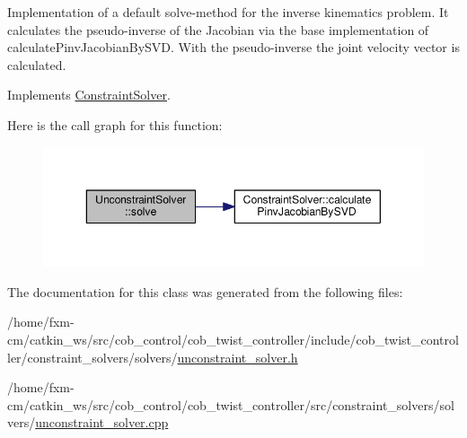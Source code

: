 Implementation of a default solve-\/method for the inverse kinematics problem. It calculates the pseudo-\/inverse of the Jacobian via the base implementation of calculate\-Pinv\-Jacobian\-By\-S\-V\-D. With the pseudo-\/inverse the joint velocity vector is calculated. 

Implements \hyperlink{classConstraintSolver_a6208240cb2dc47fdd9adfc3a069408cd}{Constraint\-Solver}.



Here is the call graph for this function\-:
\nopagebreak
\begin{figure}[H]
\begin{center}
\leavevmode
\includegraphics[width=350pt]{classUnconstraintSolver_a72e63efba891d2a55f4c95746b8d7b33_cgraph}
\end{center}
\end{figure}




The documentation for this class was generated from the following files\-:\begin{DoxyCompactItemize}
\item 
/home/fxm-\/cm/catkin\-\_\-ws/src/cob\-\_\-control/cob\-\_\-twist\-\_\-controller/include/cob\-\_\-twist\-\_\-controller/constraint\-\_\-solvers/solvers/\hyperlink{unconstraint__solver_8h}{unconstraint\-\_\-solver.\-h}\item 
/home/fxm-\/cm/catkin\-\_\-ws/src/cob\-\_\-control/cob\-\_\-twist\-\_\-controller/src/constraint\-\_\-solvers/solvers/\hyperlink{unconstraint__solver_8cpp}{unconstraint\-\_\-solver.\-cpp}\end{DoxyCompactItemize}
